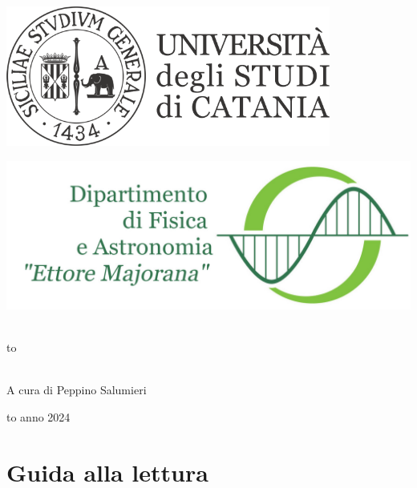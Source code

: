\documentclass[openany,12pt]{article}
\newcommand\blankpage{%
    \null
    \thispagestyle{empty}%
    \newpage}
\begin{document}
\thispagestyle{empty}
\begin{center}

\begin{minipage}[c]{0.45\textwidth}
\begin{flushleft}
\includegraphics[width=0.8\textwidth]{logo-unict-orizzontale-grigio.png}
\end{flushleft}
\end{minipage}
\hfill
\begin{minipage}[c]{0.45\textwidth}
\begin{flushright}
\includegraphics[width=\textwidth]{logo_dfa_orizzontale}
\end{flushright}
\end{minipage}\\
\medskip
\hbox to \textwidth{\hrulefill}

\vfill
\vfill


\uppercase{}\\

\vfill
\large{A cura di Peppino Salumieri}

\vfill
\vfill
\hbox to \textwidth{\hrulefill}
{\sc anno 2024}
\end{center}

\newpage

\blankpage

\tableofcontents

\newpage

\blankpage

\section*{Guida alla lettura}
\end{document}
